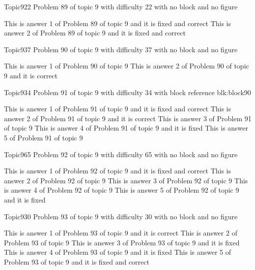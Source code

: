 \documentclass[master]{exam}
\begin{document}
\begin{problem}{Topic9}{22}
	Problem 89 of topic 9 with difficulty 22 with no block and no figure
	\begin{answers}
		 This is answer 1 of Problem 89 of topic 9 and it is fixed and correct
		 This is answer 2 of Problem 89 of topic 9 and it is fixed and correct
	\end{answers}
\end{problem}

\begin{problem}{Topic9}{37}
	Problem 90 of topic 9 with difficulty 37 with no block and no figure
	\begin{answers}
		\answer This is answer 1 of Problem 90 of topic 9 
		\answer[correct] This is answer 2 of Problem 90 of topic 9 and it is correct
	\end{answers}
\end{problem}

\begin{problem}[requires=blk:block90]{Topic9}{34}
	Problem 91 of topic 9 with difficulty 34 with block reference blk:block90
	\begin{answers}
		 This is answer 1 of Problem 91 of topic 9 and it is fixed and correct
		\answer[correct] This is answer 2 of Problem 91 of topic 9 and it is correct
		\answer This is answer 3 of Problem 91 of topic 9 
		\answer[fixed] This is answer 4 of Problem 91 of topic 9 and it is fixed
		\answer This is answer 5 of Problem 91 of topic 9 
	\end{answers}
\end{problem}

\begin{problem}{Topic9}{65}
	Problem 92 of topic 9 with difficulty 65 with no block and no figure
	\begin{answers}
		 This is answer 1 of Problem 92 of topic 9 and it is fixed and correct
		\answer This is answer 2 of Problem 92 of topic 9 
		\answer This is answer 3 of Problem 92 of topic 9 
		\answer This is answer 4 of Problem 92 of topic 9 
		\answer[fixed] This is answer 5 of Problem 92 of topic 9 and it is fixed
	\end{answers}
\end{problem}

\begin{problem}{Topic9}{30}
	Problem 93 of topic 9 with difficulty 30 with no block and no figure
	\begin{answers}
		\answer[correct] This is answer 1 of Problem 93 of topic 9 and it is correct
		\answer This is answer 2 of Problem 93 of topic 9 
		\answer[fixed] This is answer 3 of Problem 93 of topic 9 and it is fixed
		\answer[fixed] This is answer 4 of Problem 93 of topic 9 and it is fixed
		 This is answer 5 of Problem 93 of topic 9 and it is fixed and correct
	\end{answers}
\end{problem}
\end{document}
